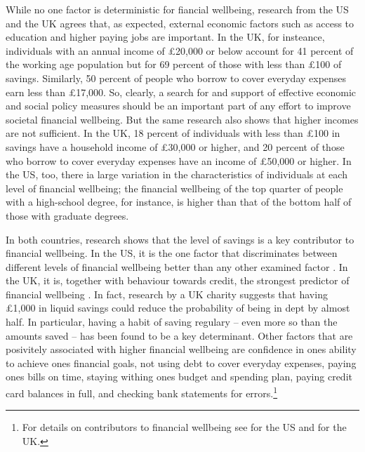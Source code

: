 While no one factor is deterministic for fiancial wellbeing, research from the
US \citep{cfpb2017financial} and the UK \citet{mps2018building} agrees that, as
expected, external economic factors such as access to education and higher
paying jobs are important. In the UK, for insteance, individuals with an annual
income of \pounds20,000 or below account for 41 percent of the working age
population but for 69 percent of those with less than \pounds100 of savings.
Similarly, 50 percent of people who borrow to cover everyday expenses earn less
than \pounds17,000. So, clearly, a search for and support of effective economic
and social policy measures should be an important part of any effort to improve
societal financial wellbeing. But the same research also shows that higher
incomes are not sufficient. In the UK, 18 percent of individuals with less than
\pounds 100 in savings have a household income of \pounds30,000 or higher, and
20 percent of those who borrow to cover everyday expenses have an income of
\pounds50,000 or higher. In the US, too, there ia large variation in the
characteristics of individuals at each level of financial wellbeing; the
financial wellbeing of the top quarter of people with a high-school degree, for
instance, is higher than that of the bottom half of those with graduate
degrees.

In both countries, research shows that the level of savings is a key
contributor to financial wellbeing. In the US, it is the one factor that
discriminates between different levels of financial wellbeing better than any
other examined factor \citep{cfpb2017financial}. In the UK, it is, together
with behaviour towards credit, the strongest predictor of financial wellbeing
\citep{mps2018building}. In fact, research by a UK charity suggests that having
\pounds1,000 in liquid savings could reduce the probability of being in dept by
almost half. In particular, having a habit of saving regulary -- even more so
than the amounts saved -- has been found to be a key determinant.  Other
factors that are posivitely associated with higher financial wellbeing are
confidence in ones ability to achieve ones financial goals, not using debt to
cover everyday expenses, paying ones bills on time, staying withing ones budget
and spending plan, paying credit card balances in full, and checking bank
statements for errors.\footnote{For details on contributors to financial
wellbeing see \citep{cfpb2017financial} for the US and \citet{mps2018building}
for the UK.}

